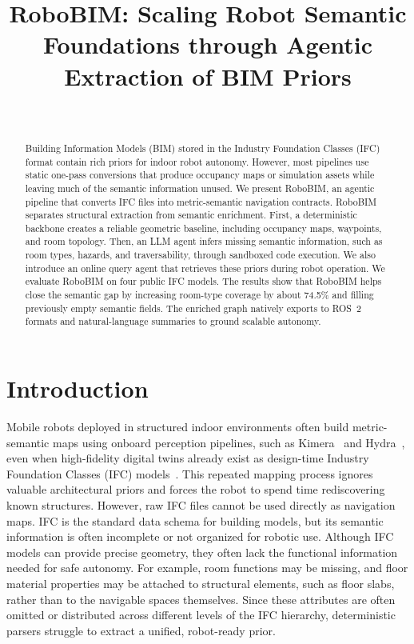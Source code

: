 \documentclass[a4paper, 10pt, conference]{ieeeconf}
\title{\LARGE \bf RoboBIM: Scaling Robot Semantic Foundations through Agentic Extraction of BIM Priors}
\author{
\IEEEauthorblockN{Ashwin Nedungadi\IEEEauthorrefmark{*}, Bharathi Kannan Nithyanantham\IEEEauthorrefmark{*}, and Stefan Luedtke\thanks{\textsuperscript{*}Equal Contribution.}}\\
\IEEEauthorblockA{\textit{Institute for Visual \& Analytical Computing, Universit\"at Rostock} \\
\{ashwin.nedungadi, bharathikannan.nithyanantham, stefan.luedtke\}@uni-rostock.de}
}
\begin{document}
%
\maketitle
\thispagestyle{arxiv} %
\pagestyle{empty}

\begin{abstract}
Building Information Models (BIM) stored in the Industry Foundation Classes (IFC) format contain rich priors for indoor robot autonomy. However, most pipelines use static one-pass conversions that produce occupancy maps or simulation assets while leaving much of the semantic information unused. We present RoboBIM, an agentic pipeline that converts IFC files into metric-semantic navigation contracts. RoboBIM separates structural extraction from semantic enrichment. First, a deterministic backbone creates a reliable geometric baseline, including occupancy maps, waypoints, and room topology. Then, an LLM agent infers missing semantic information, such as room types, hazards, and traversability, through sandboxed code execution. We also introduce an online query agent that retrieves these priors during robot operation. We evaluate RoboBIM on four public IFC models. The results show that RoboBIM helps close the semantic gap by increasing room-type coverage by about 74.5\% and filling previously empty semantic fields. The enriched graph natively exports to ROS~2 formats and natural-language summaries to ground scalable autonomy.
\end{abstract}

\section{Introduction}

Mobile robots deployed in structured indoor environments often build metric-semantic maps using onboard perception pipelines, such as Kimera~\cite{rosinol2021kimera} and Hydra~\cite{hughes2024hydra}, even when high-fidelity digital twins already exist as design-time Industry Foundation Classes (IFC) models~\cite{hamieh2021, follini2020, kim2022semantic}. This repeated mapping process ignores valuable architectural priors and forces the robot to spend time rediscovering known structures. However, raw IFC files cannot be used directly as navigation maps. IFC is the standard data schema for building models, but its semantic information is often incomplete or not organized for robotic use. Although IFC models can provide precise geometry, they often lack the functional information needed for safe autonomy. For example, room functions may be missing, and floor material properties may be attached to structural elements, such as floor slabs, rather than to the navigable spaces themselves. Since these attributes are often omitted or distributed across different levels of the IFC hierarchy, deterministic parsers struggle to extract a unified, robot-ready prior.
\end{document}
